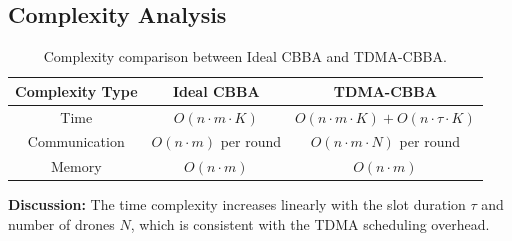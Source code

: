 \subsection{Complexity Analysis}

\begin{table}[h]
\centering
\begin{tabular}{|c|c|c|}
\hline
\textbf{Complexity Type} & \textbf{Ideal CBBA} & \textbf{TDMA-CBBA} \\
\hline
Time & $O(n \cdot m \cdot K)$ & $O(n \cdot m \cdot K) + O(n \cdot \tau \cdot K)$ \\
Communication & $O(n \cdot m)$ per round & $O(n \cdot m \cdot N)$ per round \\
Memory & $O(n \cdot m)$ & $O(n \cdot m)$ \\
\hline
\end{tabular}
\caption{Complexity comparison between Ideal CBBA and TDMA-CBBA.}
\end{table}

\textbf{Discussion:} The time complexity increases linearly with the slot duration $\tau$ and number of drones $N$, which is consistent with the TDMA scheduling overhead.